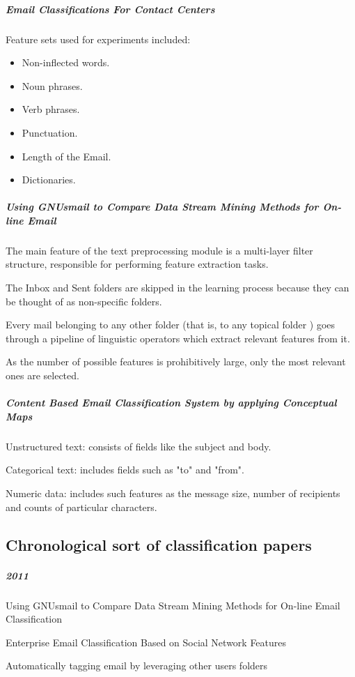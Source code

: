     \subparagraph{Email Classifications For Contact Centers \cite{ANI03}}
		\begin{my_itemize}
			\item Feature sets used for experiments included:
				\begin{itemize}
					\item Non-inflected words.
					\item Noun phrases.
					\item Verb phrases.
					\item Punctuation.
					\item Length of the Email.
					\item Dictionaries.
				\end{itemize}
		\end{my_itemize}

	\subparagraph{Using GNUsmail to Compare Data Stream Mining Methods for On-line Email \cite{JOSE11}}
		\begin{my_itemize}
			\item The main feature of the text preprocessing module is a multi-layer filter structure, responsible for performing feature extraction tasks.
			\item The Inbox and Sent folders are skipped in the learning process because they can be thought of as non-specific folders.
			\item Every mail belonging to any other folder (that is, to any topical folder ) goes through a pipeline of linguistic operators which extract relevant features from it.
			\item As the number of possible features is prohibitively large, only the most relevant ones are selected.
		\end{my_itemize}
   
	\subparagraph{Content Based Email Classification System by applying Conceptual Maps \cite{BASKARAN09}}
		\begin{my_itemize}
			\item Unstructured text: consists of fields like the subject and body.
			\item Categorical text: includes fields such as "to" and "from".
			\item Numeric data: includes such features as the message size, number of
recipients and counts of particular characters.
		\end{my_itemize}

\newpage
\subsection{Chronological sort of classification papers}
\subparagraph{2011}
\begin{my_itemize}
  \item Using GNUsmail to Compare Data Stream Mining Methods for On-line Email Classification \cite{JOSE11}
  \item Enterprise Email Classification Based on Social Network Features \cite{MIN11}
  \item Automatically tagging email by leveraging other users folders \cite{YEHUDA11}
\end{my_itemize}

